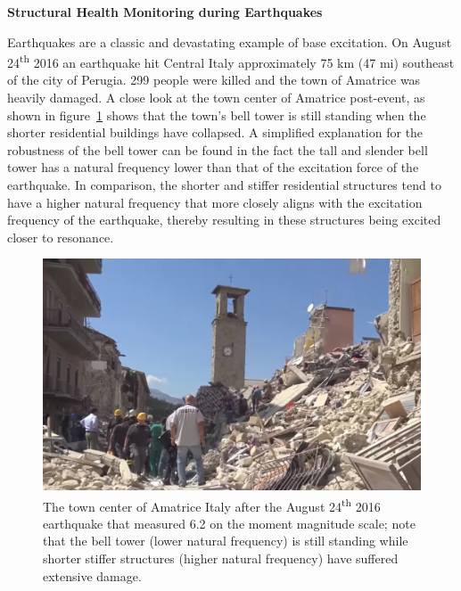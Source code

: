 \documentclass[12pt,letter]{article}
\begin{document}
\begin{vibration_case_study}

	\textbf{Structural Health Monitoring during Earthquakes}
			
	\noindent Earthquakes are a classic and devastating example of base excitation. On August 24\textsuperscript{th} 2016 an earthquake hit Central Italy approximately 75 km (47 mi) southeast of the city of Perugia. 299 people were killed and the town of Amatrice was heavily damaged. A close look at the town center of Amatrice post-event, as shown in figure~\ref{fig:Italy_2016_earthquake_1} shows that the town's bell tower is still standing when the shorter residential buildings have collapsed. A simplified explanation for the robustness of the bell tower can be found in the fact the tall and slender bell tower has a natural frequency lower than that of the excitation force of the earthquake. In comparison, the shorter and stiffer residential structures tend to have a higher natural frequency that more closely aligns with the excitation frequency of the earthquake, thereby resulting in these structures being excited closer to resonance. 
				
	\begin{figure}[H]
		\centering
		\includegraphics[width=1\textwidth]{../figures/Italy_2016_earthquake_1}
		\caption{The town center of Amatrice Italy after the August 24\textsuperscript{th} 2016 earthquake that measured 6.2  on the moment magnitude scale; note that the bell tower (lower natural frequency) is still standing while shorter stiffer structures (higher natural frequency) have suffered extensive damage.\protect\footnotemark[1] }
		\label{fig:Italy_2016_earthquake_1}
	\end{figure}
	

\end{vibration_case_study}
\end{document}
